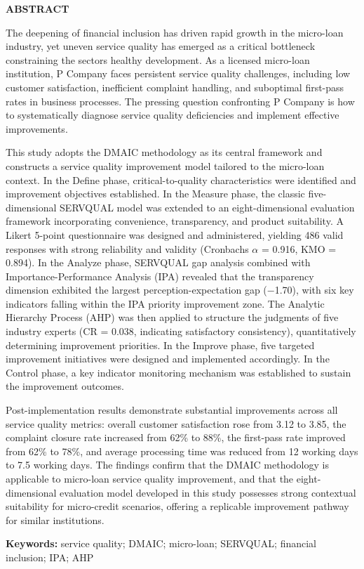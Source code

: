 \centerline{\bfseries ABSTRACT}

\vspace{1em}

The deepening of financial inclusion has driven rapid growth in the micro-loan industry, yet uneven service quality has emerged as a critical bottleneck constraining the sector\textquotesingle s healthy development. As a licensed micro-loan institution, P Company faces persistent service quality challenges, including low customer satisfaction, inefficient complaint handling, and suboptimal first-pass rates in business processes. The pressing question confronting P Company is how to systematically diagnose service quality deficiencies and implement effective improvements.

This study adopts the DMAIC methodology as its central framework and constructs a service quality improvement model tailored to the micro-loan context. In the Define phase, critical-to-quality characteristics were identified and improvement objectives established. In the Measure phase, the classic five-dimensional SERVQUAL model was extended to an eight-dimensional evaluation framework incorporating convenience, transparency, and product suitability. A Likert 5-point questionnaire was designed and administered, yielding 486 valid responses with strong reliability and validity (Cronbach\textquotesingle s $\alpha$ = 0.916, KMO = 0.894). In the Analyze phase, SERVQUAL gap analysis combined with Importance-Performance Analysis (IPA) revealed that the transparency dimension exhibited the largest perception-expectation gap ($-$1.70), with six key indicators falling within the IPA priority improvement zone. The Analytic Hierarchy Process (AHP) was then applied to structure the judgments of five industry experts (CR = 0.038, indicating satisfactory consistency), quantitatively determining improvement priorities. In the Improve phase, five targeted improvement initiatives were designed and implemented accordingly. In the Control phase, a key indicator monitoring mechanism was established to sustain the improvement outcomes.

Post-implementation results demonstrate substantial improvements across all service quality metrics: overall customer satisfaction rose from 3.12 to 3.85, the complaint closure rate increased from 62\% to 88\%, the first-pass rate improved from 62\% to 78\%, and average processing time was reduced from 12 working days to 7.5 working days. The findings confirm that the DMAIC methodology is applicable to micro-loan service quality improvement, and that the eight-dimensional evaluation model developed in this study possesses strong contextual suitability for micro-credit scenarios, offering a replicable improvement pathway for similar institutions.

\vspace{1em}
\noindent\textbf{ Keywords:} service quality; DMAIC; micro-loan; SERVQUAL; financial inclusion; IPA; AHP
